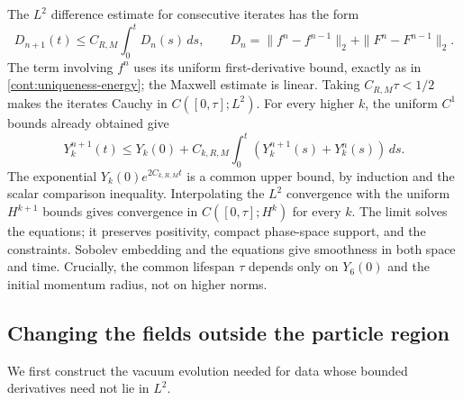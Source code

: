The $L^2$ difference estimate for consecutive iterates has the form
\[
 D_{n+1}(t)\le C_{R,M}\int_0^t D_n(s)\,ds,
 \qquad
 D_n=\|f^n-f^{n-1}\|_2+\|F^n-F^{n-1}\|_2.
\]
The term involving $f^n$ uses its uniform first-derivative bound,
exactly as in \eqref{cont:uniqueness-energy}; the Maxwell estimate is
linear.  Taking $C_{R,M}\tau<1/2$ makes the iterates Cauchy in
$C([0,\tau];L^2)$.
For every higher $k$, the uniform $C^1$ bounds already obtained give
\[
 Y_k^{n+1}(t)\le Y_k(0)+C_{k,R,M}\int_0^t
                    (Y_k^{n+1}(s)+Y_k^n(s))\,ds.
\]
The exponential $Y_k(0)e^{2C_{k,R,M}t}$ is a common upper bound, by
induction and the scalar comparison inequality.  Interpolating the
$L^2$ convergence with the uniform $H^{k+1}$ bounds gives convergence
in $C([0,\tau];H^k)$ for every $k$.  The limit solves the equations;
it preserves positivity, compact phase-space support, and the
constraints.  Sobolev embedding and the equations give smoothness in
both space and time.  Crucially, the common lifespan $\tau$ depends
only on $Y_6(0)$ and the initial momentum radius, not on higher norms.

\subsection{Changing the fields outside the particle region}

We first construct the vacuum evolution needed for data whose bounded
derivatives need not lie in $L^2$.

